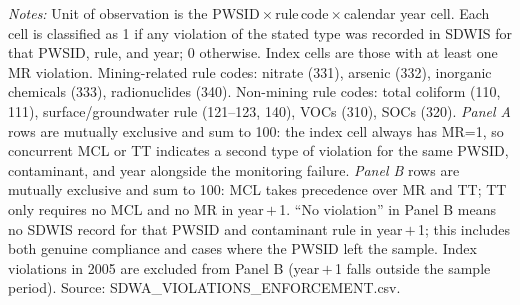 \begin{table}[htbp]
\begin{minipage}{\linewidth}
\textit{Notes:} Unit of observation is the PWSID\,$\times$\,rule\,code\,$\times$\,calendar year cell. Each cell is classified as 1 if any violation of the stated type was recorded in SDWIS for that PWSID, rule, and year; 0 otherwise. Index cells are those with at least one MR violation. Mining-related rule codes: nitrate (331), arsenic (332), inorganic chemicals (333), radionuclides (340). Non-mining rule codes: total coliform (110, 111), surface/groundwater rule (121--123, 140), VOCs (310), SOCs (320). \textit{Panel A} rows are mutually exclusive and sum to 100: the index cell always has MR=1, so concurrent MCL or TT indicates a second type of violation for the same PWSID, contaminant, and year alongside the monitoring failure. \textit{Panel B} rows are mutually exclusive and sum to 100: MCL takes precedence over MR and TT; TT only requires no MCL and no MR in year\,$+$\,1. ``No violation'' in Panel B means no SDWIS record for that PWSID and contaminant rule in year\,$+$\,1; this includes both genuine compliance and cases where the PWSID left the sample. Index violations in 2005 are excluded from Panel B (year\,$+$\,1 falls outside the sample period). Source: SDWA\_VIOLATIONS\_ENFORCEMENT.csv.
\end{minipage}
\end{table}
